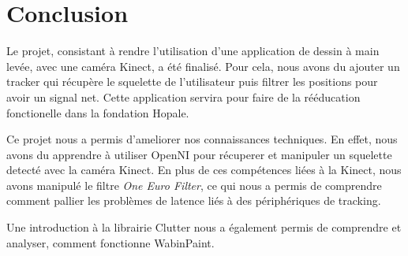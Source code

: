 \chapter{Conclusion}
Le projet, consistant à rendre l'utilisation d'une application de dessin à main levée, avec une caméra Kinect, a été finalisé. Pour cela, nous avons du ajouter un tracker qui récupère le squelette de l'utilisateur puis filtrer les positions pour avoir un signal net. Cette application servira pour faire de la rééducation fonctionelle dans la fondation Hopale.

Ce projet nous a permis d'ameliorer nos connaissances techniques. En effet, nous avons du apprendre à utiliser OpenNI pour récuperer et manipuler un squelette detecté avec la caméra Kinect. En plus de ces compétences liées à la Kinect, nous avons manipulé le filtre \textit{One Euro Filter}, ce qui nous a permis de comprendre comment pallier les problèmes de latence liés à des périphériques de tracking.

Une introduction à la librairie Clutter nous a également permis de comprendre et analyser, comment fonctionne WabinPaint. 